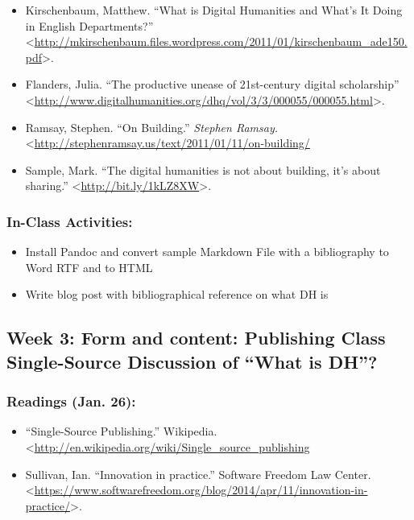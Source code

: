 \documentclass[]{article}
\begin{document}
\begin{itemize}
\itemsep1pt\parskip0pt
\item
  Kirschenbaum, Matthew. ``What is Digital Humanities and What's It
  Doing in English Departments?''
  \textless{}\url{http://mkirschenbaum.files.wordpress.com/2011/01/kirschenbaum_ade150.pdf}\textgreater{}.
\item
  Flanders, Julia. ``The productive unease of 21st-century digital
  scholarship''
  \textless{}\url{http://www.digitalhumanities.org/dhq/vol/3/3/000055/000055.html}\textgreater{}.
\item
  Ramsay, Stephen. ``On Building.'' \emph{Stephen Ramsay.}
  \textless{}\url{http://stephenramsay.us/text/2011/01/11/on-building/}
\item
  Sample, Mark. ``The digital humanities is not about building, it's
  about sharing.'' \textless{}\url{http://bit.ly/1kLZ8XW}\textgreater{}.
\end{itemize}

\subsubsection{In-Class Activities:}\label{in-class-activities}

\begin{itemize}
\itemsep1pt\parskip0pt
\item
  Install Pandoc and convert sample Markdown File with a bibliography to
  Word RTF and to HTML
\item
  Write blog post with bibliographical reference on what DH is
\end{itemize}

\subsection{Week 3: Form and content: Publishing Class Single-Source
Discussion of ``What is
DH''?}\label{week-3-form-and-content-publishing-class-single-source-discussion-of-what-is-dh}

\subsubsection{Readings (Jan. 26):}\label{readings-jan.-26}

\begin{itemize}
\itemsep1pt\parskip0pt
\item
  ``Single-Source Publishing.'' Wikipedia.
  \textless{}\url{http://en.wikipedia.org/wiki/Single_source_publishing}
\item
  Sullivan, Ian. ``Innovation in practice.'' Software Freedom Law
  Center.
  \textless{}\url{https://www.softwarefreedom.org/blog/2014/apr/11/innovation-in-practice/}\textgreater{}.
\end{itemize}
\end{document}
